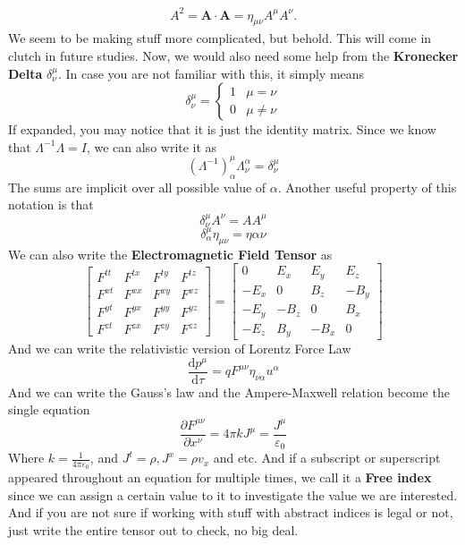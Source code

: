 \documentclass[12pt]{book}
\newcommand{\pypx}[2]{\frac{\partial #1}{\partial #2}}
\newcommand{\paren}[1]{\left( #1 \right)}
\newcommand{\etensor}[3]{#1_{#3}^{#2}}
\begin{document}
\begin{align}
A^2 = \mathbf{A} \cdot \mathbf{A} = \eta_{\mu \nu} A^\mu A^\nu. 
\end{align}
We seem to be making stuff more complicated, but behold. This will come in clutch in future studies. Now, we would also need some help from the \textbf{Kronecker Delta} $\etensor{\delta}{\mu}{\nu}$. In case you are not familiar with this, it simply means
\[
\etensor{\delta}{\mu}{\nu} = \begin{cases}
    1 &\mu=\nu\\
    0 &\mu\neq\nu
\end{cases}
\]
If expanded, you may notice that it is just the identity matrix. Since we know that $\Lambda^{-1}\Lambda = I$, we can also write it as
\[
\etensor{\paren{\Lambda^{-1}}}{\mu}{\alpha}\etensor{\Lambda}{\alpha}{\nu} = \etensor{\delta}{\mu}{\nu}
\]
The sums are implicit over all possible value of $\alpha$. Another useful property of this notation is that
\[
\etensor{\delta}{\mu}{\nu}A^{\nu } = AA^{\mu}
\]
\[
\etensor{\delta}{\mu}{\alpha}\eta_{\mu\nu} = \eta{\alpha\nu}
\]
We can also write the \textbf{Electromagnetic Field Tensor} as
\[
\begin{bmatrix}
F^{tt} & F^{tx} & F^{ty} & F^{tz} \\
F^{xt} & F^{xx} & F^{xy} & F^{xz} \\
F^{yt} & F^{yx} & F^{yy} & F^{yz} \\
F^{zt} & F^{zx} & F^{zy} & F^{zz}
\end{bmatrix}
=
\begin{bmatrix}
0 & E_x & E_y & E_z \\
-E_x & 0 & B_z & -B_y \\
-E_y & -B_z & 0 & B_x \\
-E_z & B_y & -B_x & 0
\end{bmatrix}
\]  
And we can write the relativistic version of Lorentz Force Law
\[
\frac{\text{d}p^\mu}{\text{d}\tau}=qF^{\mu\nu}\eta_{\nu\alpha}u^{\alpha}
\]
And we can write the Gauss's law and the Ampere-Maxwell relation become the single equation
\[
\pypx{F^{\mu\nu}}{x^\nu} = 4\pi k J^\mu = \frac{J^{\mu}}{\varepsilon_0}
\]
Where $k = \frac{1}{4\pi\varepsilon_0}$, and $J^t = \rho,J^x=\rho v_x$ and etc. And if a subscript or superscript appeared throughout an equation for multiple times, we call it a \textbf{Free index} since we can assign a certain value to it to investigate the value we are interested. 
And if you are not sure if working with stuff with abstract indices is legal or not, just write the entire tensor out to check, no big deal. 
\end{document}
